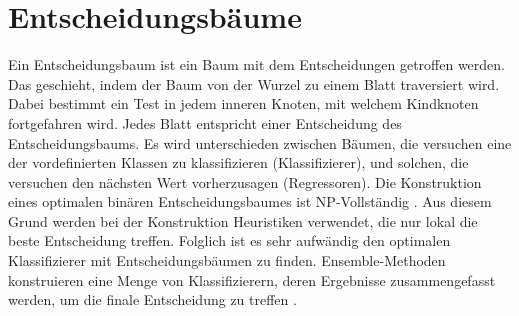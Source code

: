 \chapter{Entscheidungsbäume}
Ein Entscheidungsbaum ist ein Baum mit dem Entscheidungen getroffen werden. Das geschieht, indem der Baum von der Wurzel zu einem Blatt traversiert wird. Dabei bestimmt ein Test in jedem inneren Knoten,
mit welchem Kindknoten fortgefahren wird. Jedes Blatt entspricht einer Entscheidung des Entscheidungsbaums. Es wird unterschieden zwischen Bäumen, die versuchen eine der vordefinierten Klassen zu
klassifizieren (Klassifizierer), und solchen, die versuchen den nächsten Wert vorherzusagen (Regressoren).
\newline
\newline
Die Konstruktion eines optimalen binären Entscheidungsbaumes ist NP-Vollständig \cite{laurent1976constructing}. Aus diesem Grund werden bei der Konstruktion
Heuristiken verwendet, die nur lokal die beste Entscheidung treffen. Folglich ist es sehr aufwändig den optimalen Klassifizierer mit Entscheidungsbäumen zu finden. Ensemble-Methoden konstruieren eine Menge von
Klassifizierern, deren Ergebnisse zusammengefasst werden, um die finale Entscheidung zu treffen \cite{dietterich2002ensemble}.



